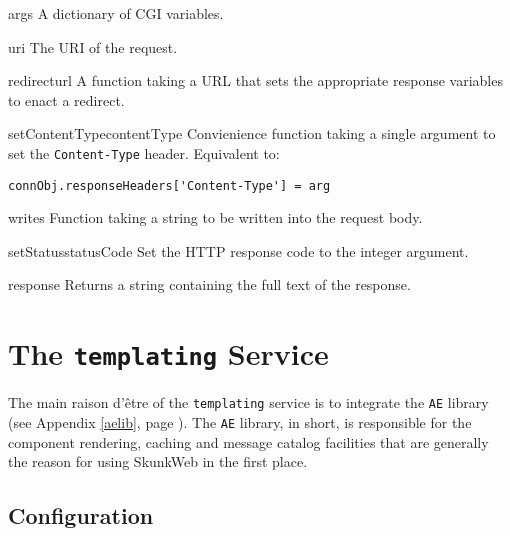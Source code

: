 \documentclass{manual}
\begin{document}
\begin{memberdesc}[dictionary]{args} A dictionary of CGI variables.
\end{memberdesc}
\begin{memberdesc}[string]{uri} The URI of the request.
\end{memberdesc}

\begin{methoddesc}{redirect}{url}  A function taking a URL that sets the appropriate response
variables to enact a redirect.  
\end{methoddesc}
\begin{methoddesc}{setContentType}{contentType}  Convienience function taking a single argument
to set the \texttt{Content-Type} header.  Equivalent to:
\begin{verbatim}
connObj.responseHeaders['Content-Type'] = arg
\end{verbatim}
\end{methoddesc}
\begin{methoddesc}{write}{s} Function taking a string to be written into the request body.
\end{methoddesc}
\begin{methoddesc}{setStatus}{statusCode} Set the HTTP response code to the integer argument.
\end{methoddesc}
\begin{methoddesc}{response}{} Returns a string containing the full text of the response.
\end{methoddesc}


\chapter{The \texttt{templating} Service}
The main raison d'\^etre of the \texttt{templating} service is to
integrate the \texttt{AE} library (see Appendix \ref{aelib}, page
\pageref{aelib}).  The \texttt{AE} library, in short, is responsible
for the component rendering, caching and message catalog facilities
that are generally the reason for using SkunkWeb in the first place.

\section{Configuration}
\end{document}
